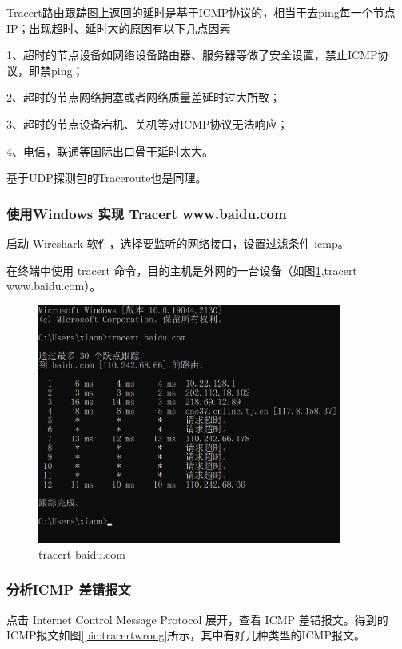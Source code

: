 \documentclass[a4paper,12pt]{report}
\begin{document}
\begin{spacing}{1.5}
Tracert路由跟踪图上返回的延时是基于ICMP协议的，相当于去ping每一个节点IP；出现超时、延时大的原因有以下几点因素

1、超时的节点设备如网络设备路由器、服务器等做了安全设置，禁止ICMP协议，即禁ping；

2、超时的节点网络拥塞或者网络质量差延时过大所致；

3、超时的节点设备宕机、关机等对ICMP协议无法响应；

4、电信，联通等国际出口骨干延时太大。

基于UDP探测包的Traceroute也是同理。

\subsubsection{使用Windows 实现 Tracert www.baidu.com}

启动 Wireshark 软件，选择要监听的网络接口，设置过滤条件 icmp。

在终端中使用 tracert 命令，目的主机是外网的一台设备（如图\ref{pic:tracertbaidu},tracert www.baidu.com）。


\begin{figure}[htb!]
  \centering
\includegraphics[width=10cm]{figure/tracertbaidu.png}
\caption{tracert baidu.com}
\label{pic:tracertbaidu}
\end{figure}



\subsubsection{分析ICMP 差错报文}

点击 Internet Control Message Protocol 展开，查看 ICMP 差错报文。得到的ICMP报文如图\ref{pic:tracertwrong}所示，其中有好几种类型的ICMP报文。


\end{spacing}
\end{document}
